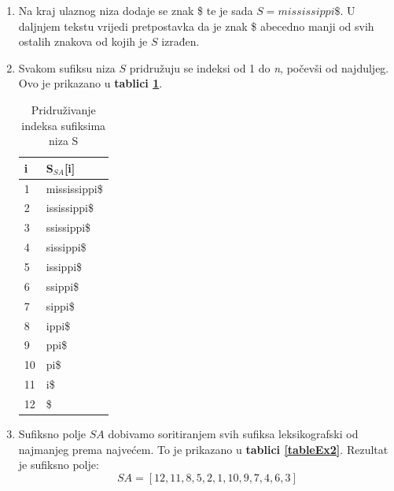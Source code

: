 \documentclass[a4paper,12pt]{article}
\begin{document}
\begin{enumerate}
	\item Na kraj ulaznog niza dodaje se znak \$ te je sada $S =  mississippi\$$. U daljnjem tekstu vrijedi pretpostavka da je znak \$ abecedno manji od svih ostalih znakova od kojih je $S$ izrađen.
	\item Svakom sufiksu niza $S$ pridružuju se indeksi od 1 do \textit{n}, počevši od najduljeg. Ovo je prikazano u \textbf{tablici \ref{tableEx1}}.

	\begin{table}[h!]
		\caption{Pridruživanje indeksa sufiksima niza S}
		\label{tableEx1}
		\begin{center}
			\begin{tabular}{ll}
				\toprule
				i & S$_{SA}$[i] \\
				\midrule
				1 & mississippi\$ \\
				2 & ississippi\$ \\
				3 & ssissippi\$ \\
				4 & sissippi\$ \\
				5 & issippi\$ \\
				6 & ssippi\$ \\
				7 & sippi\$ \\
				8 & ippi\$ \\
				9 & ppi\$ \\
				10 & pi\$ \\
				11 & i\$ \\
				12 & \$ \\
				\bottomrule
			\end{tabular}
		\end{center}
	\end{table}

	\item Sufiksno polje $SA$ dobivamo soritiranjem svih sufiksa leksikografski od najmanjeg prema najvećem. To je prikazano u \textbf{tablici \ref{tableEx2}}. Rezultat je sufiksno polje:
	$$SA = [12, 11, 8, 5, 2, 1, 10, 9, 7, 4, 6, 3]$$


\end{enumerate}
\end{document}
